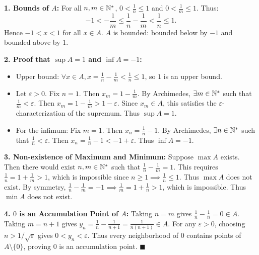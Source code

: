 \begin{tabletworkspace}[5.0cm]
\end{tabletworkspace}

\begin{solution}
\textbf{1. Bounds of $A$:}
For all $n, m \in \mathbb{N}^*$, $0 < \frac{1}{n} \le 1$ and $0 < \frac{1}{m} \le 1$.
Thus:
\[
-1 < -\frac{1}{m} \le \frac{1}{n} - \frac{1}{m} < \frac{1}{n} \le 1.
\]
Hence $-1 < x < 1$ for all $x \in A$. $A$ is bounded: bounded below by $-1$ and bounded above by $1$.

\textbf{2. Proof that $\sup A = 1$ and $\inf A = -1$:}
\begin{itemize}[leftmargin=1.5em,itemsep=2pt]
  \item Upper bound: $\forall x \in A, x = \frac{1}{n} - \frac{1}{m} < \frac{1}{n} \le 1$, so $1$ is an upper bound.
  \item Let $\varepsilon > 0$. Fix $n = 1$. Then $x_m = 1 - \frac{1}{m}$.
  By Archimedes, $\exists m \in \mathbb{N}^*$ such that $\frac{1}{m} < \varepsilon$.
  Then $x_m = 1 - \frac{1}{m} > 1 - \varepsilon$.
  Since $x_m \in A$, this satisfies the $\varepsilon$-characterization of the supremum. Thus $\sup A = 1$.
  \item For the infimum: Fix $m = 1$. Then $x_n = \frac{1}{n} - 1$.
  By Archimedes, $\exists n \in \mathbb{N}^*$ such that $\frac{1}{n} < \varepsilon$.
  Then $x_n = \frac{1}{n} - 1 < -1 + \varepsilon$.
  Thus $\inf A = -1$.
\end{itemize}

\textbf{3. Non-existence of Maximum and Minimum:}
Suppose $\max A$ exists. Then there would exist $n, m \in \mathbb{N}^*$ such that $\frac{1}{n} - \frac{1}{m} = 1$.
This requires $\frac{1}{n} = 1 + \frac{1}{m} > 1$, which is impossible since $n \ge 1 \implies \frac{1}{n} \le 1$.
Thus $\max A$ does not exist.
By symmetry, $\frac{1}{n} - \frac{1}{m} = -1 \implies \frac{1}{m} = 1 + \frac{1}{n} > 1$, which is impossible.
Thus $\min A$ does not exist.

\textbf{4. $0$ is an Accumulation Point of $A$:}
Taking $n = m$ gives $\frac{1}{n} - \frac{1}{n} = 0 \in A$.
Taking $m = n + 1$ gives $y_n = \frac{1}{n} - \frac{1}{n+1} = \frac{1}{n(n+1)} \in A$.
For any $\varepsilon > 0$, choosing $n > 1/\sqrt{\varepsilon}$ gives $0 < y_n < \varepsilon$.
Thus every neighborhood of $0$ contains points of $A \setminus \{0\}$, proving $0$ is an accumulation point. \hfill $\blacksquare$
\end{solution}

